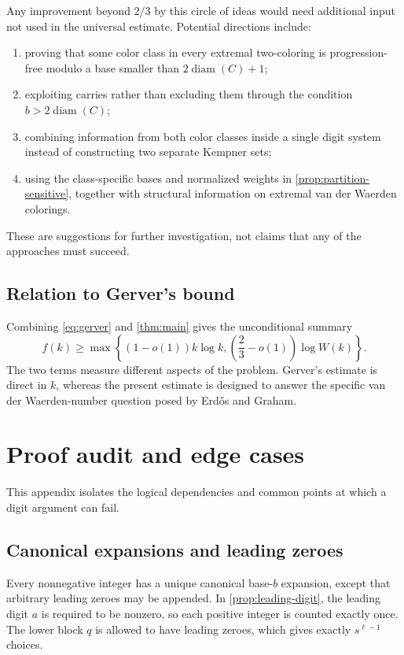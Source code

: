 \documentclass[11pt]{article}
\theoremstyle{definition}
\theoremstyle{remark}
\newcommand{\diam}{\operatorname{diam}}
\begin{document}
Any improvement beyond $2/3$ by this circle of ideas would need additional
input not used in the universal estimate.  Potential directions include:
\begin{enumerate}[label=(\roman*),leftmargin=2.4em]
 \item proving that some color class in every extremal two-coloring is
 progression-free modulo a base smaller than $2\diam(C)+1$;
 \item exploiting carries rather than excluding them through the condition
 $b>2\diam(C)$;
 \item combining information from both color classes inside a single
 digit system instead of constructing two separate Kempner sets;
 \item using the class-specific bases and normalized weights in
 \cref{prop:partition-sensitive}, together with structural information on
 extremal van der Waerden colorings.
\end{enumerate}
These are suggestions for further investigation, not claims that any of the
approaches must succeed.

\subsection{Relation to Gerver's bound}

Combining \cref{eq:gerver} and \cref{thm:main} gives the unconditional
summary
\[
 f(k)\ge
 \max\left\{
   (1-o(1))k\log k,
   \left(\frac23-o(1)\right)\log W(k)
 \right\}.
\]
The two terms measure different aspects of the problem.  Gerver's estimate
is direct in $k$, whereas the present estimate is designed to answer the
specific van der Waerden-number question posed by Erd\H{o}s and Graham.

\appendix

\section{Proof audit and edge cases}

This appendix isolates the logical dependencies and common points at which
a digit argument can fail.

\subsection{Canonical expansions and leading zeroes}

Every nonnegative integer has a unique canonical base-$b$ expansion, except
that arbitrary leading zeroes may be appended.  In
\cref{prop:leading-digit}, the leading digit $a$ is required to be nonzero,
so each positive integer is counted exactly once.  The lower block $q$ is
allowed to have leading zeroes, which gives exactly $s^{\ell-1}$ choices.
\end{document}
